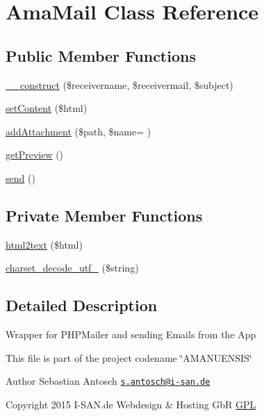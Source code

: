 \hypertarget{class_ama_mail}{}\section{Ama\+Mail Class Reference}
\label{class_ama_mail}
\subsection*{Public Member Functions}
\begin{DoxyCompactItemize}
\item 
\hyperlink{class_ama_mail_ad08be69919daaa811af55b17ebbb8af9}{\+\_\+\+\_\+construct} (\$receivername, \$receivermail, \$subject)
\item 
\hyperlink{class_ama_mail_aea60bc046c572df8f2a87a2d388116a1}{set\+Content} (\$html)
\item 
\hyperlink{class_ama_mail_afde2b37e8fbc3f69d966f2e3aee1306f}{add\+Attachment} (\$path, \$name= \textquotesingle{}\textquotesingle{})
\item 
\hyperlink{class_ama_mail_ab858356a1ff88c3d4efe48f1bf3a9028}{get\+Preview} ()
\item 
\hyperlink{class_ama_mail_a12bcef5130168b80d3d52dc82213f19a}{send} ()
\end{DoxyCompactItemize}
\subsection*{Private Member Functions}
\begin{DoxyCompactItemize}
\item 
\hyperlink{class_ama_mail_a0a043c52d9e70e64ac1d0d801df3f30a}{html2text} (\$html)
\item 
\hyperlink{class_ama_mail_a62c74adc4d0bd5fdf881b127102f1b32}{charset\+\_\+decode\+\_\+utf\+\_} (\$string)
\end{DoxyCompactItemize}


\subsection{Detailed Description}
Wrapper for P\+H\+P\+Mailer and sending Emails from the App

This file is part of the project codename \char`\"{}\+A\+M\+A\+N\+U\+E\+N\+S\+I\+S\char`\"{}

\begin{DoxyAuthor}{Author}
Sebastian Antosch \href{mailto:s.antosch@i-san.de}{\tt s.\+antosch@i-\/san.\+de} 
\end{DoxyAuthor}
\begin{DoxyCopyright}{Copyright}
2015 I-\/\+S\+A\+N.\+de Webdesign \& Hosting Gb\+R \hyperlink{}{G\+P\+L }
\end{DoxyCopyright}


